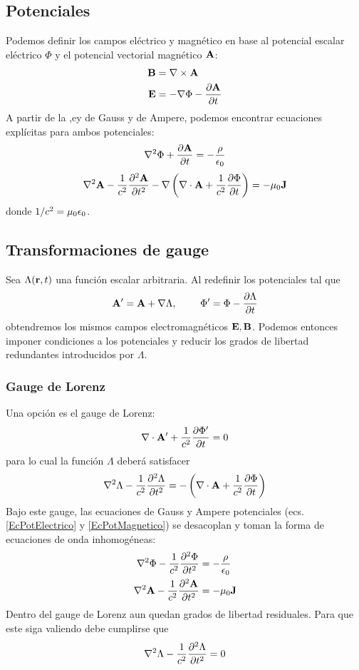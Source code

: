 \documentclass[]{article}
\numberwithin{equation}{section}
\begin{document}
\subsection{Potenciales}
Podemos definir los campos eléctrico y magnético en base al potencial escalar eléctrico \(\Phi\) y el potencial vectorial magnético \(\mathbf{A}\):
\begin{align}
	\mathbf{B} &= \nabla\times\mathbf{A} \label{B_Pot}\\
	\mathbf{E} &= -\nabla\Phi - \dfrac{\partial \mathbf{A}}{\partial t} \label{E_Pot}
\end{align}
A partir de la ,ey de Gauss y de Ampere, podemos encontrar ecuaciones explícitas para ambos potenciales:
\begin{equation}
	\nabla^2\Phi + \dfrac{\partial \mathbf{A}}{\partial t} = - \frac{\rho}{\epsilon_{0}} \label{EcPotElectrico}
\end{equation}
\begin{equation}
	\nabla^2\mathbf{A} - \frac{1}{c^2}\dfrac{\partial ^2\mathbf{A}}{\partial t^2} - \nabla\left(\nabla\cdot\mathbf{A} + \frac{1}{c^2} \dfrac{\partial \Phi}{\partial t}\right) = -\mu_{0}\mathbf{J} \label{EcPotMagnetico}
\end{equation}
donde \(1/c^2 = \mu_{0}\epsilon_{0}\).

\subsection{Transformaciones de gauge}
Sea \(\Lambda(\mathbf{r},t)\) una función escalar arbitraria. Al redefinir los potenciales tal que
\begin{equation}
	\mathbf{A}' = \mathbf{A} + \nabla\Lambda, ~~~~~~~ \Phi' = \Phi - \dfrac{\partial \Lambda}{\partial t}
\end{equation}
obtendremos los mismos campos electromagnéticos \(\mathbf{E}, \mathbf{B}\). Podemos entonces imponer condiciones a los potenciales y reducir los grados de libertad redundantes introducidos por \(\Lambda\).

\subsubsection{Gauge de Lorenz}
Una opción es el gauge de Lorenz:
\begin{equation}
	\nabla\cdot\mathbf{A}' + \frac{1}{c^2}\dfrac{\partial \Phi'}{\partial t} = 0 \label{gaugeLorenz}
\end{equation}
para lo cual la función \(\Lambda\) deberá satisfacer
\begin{equation}
	\nabla^2\Lambda - \frac{1}{c^2}\dfrac{\partial ^2\Lambda}{\partial t^2} = - \left(\nabla\cdot\mathbf{A} + \frac{1}{c^2}\dfrac{\partial \Phi}{\partial t}\right)
\end{equation}
Bajo este gauge, las ecuaciones de Gauss y Ampere potenciales (ecs. \ref{EcPotElectrico} y \ref{EcPotMagnetico}) se desacoplan y toman la forma de ecuaciones de onda inhomogéneas:
\begin{align}
	\nabla^2\Phi - \frac{1}{c^2}\dfrac{\partial ^2\Phi}{\partial t^2} &= -\frac{\rho}{\epsilon_{0}} \label{EcPotElectricoLorenz}\\
	\nabla^2\mathbf{A} - \frac{1}{c^2}\dfrac{\partial ^2\mathbf{A}}{\partial t^2} &= -\mu_{0}\mathbf{J} \label{EcPotMagneticoLorenz}
\end{align}
Dentro del gauge de Lorenz aun quedan grados de libertad residuales. Para que este siga valiendo debe cumplirse que
\begin{equation}
	\nabla^2\Lambda - \frac{1}{c^2}\dfrac{\partial ^2\Lambda}{\partial t^2} = 0
\end{equation}
\end{document}
